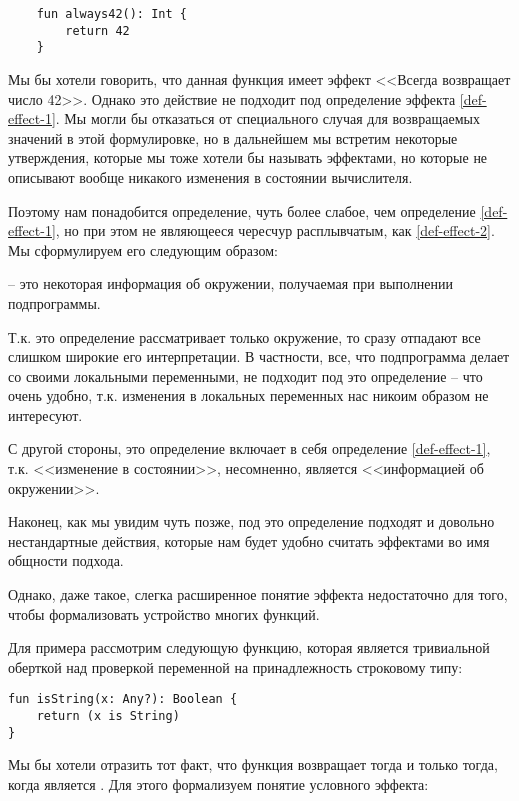 \begin{verbatim}
    fun always42(): Int {
        return 42
    }
\end{verbatim}

Мы бы хотели говорить, что данная функция имеет эффект <<Всегда возвращает число 42>>. Однако это действие не подходит под определение эффекта \ref{def-effect-1}. Мы могли бы отказаться от специального случая для возвращаемых значений в этой формулировке, но в дальнейшем мы встретим некоторые утверждения, которые мы тоже хотели бы называть эффектами, но которые не описывают вообще никакого изменения в состоянии вычислителя.

Поэтому нам понадобится определение, чуть более слабое, чем определение \ref{def-effect-1}, но при этом не являющееся чересчур расплывчатым, как \ref{def-effect-2}. Мы сформулируем его следующим образом:

\begin{definition}
    \label{def-effect}
     -- это некоторая информация об окружении, получаемая при выполнении подпрограммы.
\end{definition}

Т.к. это определение рассматривает только окружение, то сразу отпадают все слишком широкие его интерпретации. В частности, все, что подпрограмма делает со своими локальными переменными, не подходит под это определение -- что очень удобно, т.к. изменения в локальных переменных нас никоим образом не интересуют.

С другой стороны, это определение включает в себя определение \ref{def-effect-1}, т.к. <<изменение в состоянии>>, несомненно, является <<информацией об окружении>>.

Наконец, как мы увидим чуть позже, под это определение подходят и довольно нестандартные действия, которые нам будет удобно считать эффектами во имя общности подхода.

\bigskip

Однако, даже такое, слегка расширенное понятие эффекта недостаточно для того, чтобы формализовать устройство многих функций. 

Для примера рассмотрим следующую функцию, которая является тривиальной оберткой над проверкой переменной на принадлежность строковому типу:

\begin{verbatim}
fun isString(x: Any?): Boolean {
    return (x is String)
}
\end{verbatim}

Мы бы хотели отразить тот факт, что функция возвращает  тогда и только тогда, когда  является . Для этого формализуем понятие условного эффекта:

